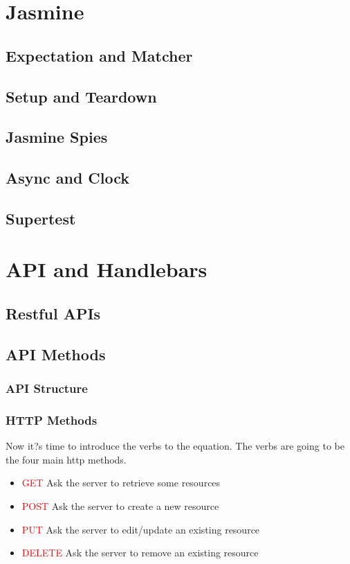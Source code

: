 \documentclass[a4paper]{article}
\begin{document}
\section{Jasmine}
\subsection{Expectation and Matcher}
\subsection{Setup and Teardown}
\subsection{Jasmine Spies}
\subsection{Async and Clock}
\subsection{Supertest}

\section{API and Handlebars}
\subsection{Restful APIs}
\subsection{API Methods}
\subsubsection{API Structure}
\subsubsection{HTTP Methods}
Now it?s time to introduce the verbs to the equation. The verbs are going to be the four main http methods.
\begin{itemize}
\item \textcolor{red}{GET} Ask the server to retrieve some resources
\item \textcolor{red}{POST} Ask the server to create a new resource
\item \textcolor{red}{PUT}  Ask the server to edit/update an existing resource
\item \textcolor{red}{DELETE} Ask the server to remove an existing resource
\end{itemize}
\end{document}
